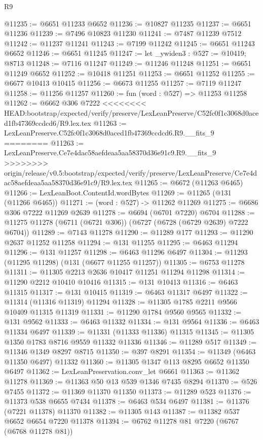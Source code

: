 \begin{lexlean}{R9}
\begin{coremodule}
{{{{{{{{{{{{{{{{{{{{{{{{{{{{{{{{{{{{{{{{{{{{{{{{{{{{{{{{{{{{{{{{{{{{{{{{{{{{{{{{{{{{@11235 := @6651 @11233 @6652
@11236 := @10827 @11235
@11237 := @6651 @11236
@11239 := @7496 @10823 @11230
@11241 := @7487 @11239 @7512
@11242 := @11237 @11241
@11243 := @7199 @11242
@11245 := @6651 @11243 @6652
@11246 := @6651 @11245
@11247 := let _ywiden3 : @527 := @10419; @8713
@11248 := @7116 @11247
@11249 := @11246 @11248
@11251 := @6651 @11249 @6652
@11252 := @10418 @11251
@11253 := @6651 @11252
@11255 := @6677 @10413 @10415
@11256 := @6673 @11255
@11257 := @7119 @11247
@11258 := @11256 @11257
@11260 := fun (word : @527) => @11253 @11258
@11262 := @6662 @306 @7222
<<<<<<<< HEAD:bootstrap/expected/verify/preserve/LexLeanPreserve/C52fc0f1c3068d0aced1fb47369ccdcd6/R9.lex.tex
@11263 := LexLeanPreserve.C52fc0f1c3068d0aced1fb47369ccdcd6.R9.__fits_9
========
@11263 := LexLeanPreserve.Ce7e4dac58aefdeaa5aa58370d36e91c9.R9.__fits_9
>>>>>>>> origin/release/v0.5:bootstrap/expected/verify/preserve/LexLeanPreserve/Ce7e4dac58aefdeaa5aa58370d36e91c9/R9.lex.tex
@11265 := @6672 (@11263 @6465)
@11266 := LexLeanBoot.ContentId.wordBytes
@11269 := @11265 (@131 (@11266 @6465))
@11271 := (word : @527) -> @11262 @11269
@11275 := @6686 @306 @7222 @11269 @2639
@11278 := @6694 (@6701 @7220) @6704
@11288 := @11275 @11278 (@6711 (@6721 @306)) (@6727 (@6728 (@6729 @2639) @7222 @6704))
@11289 := @7143 @11278
@11290 := @11289 @177
@11293 := @11290 @2637 @11252 @11258
@11294 := @131 @11255
@11295 := @6463 @11294
@11296 := @131 @11257
@11298 := @6463 @11296 @6497
@11304 := @11293 (@11295 @11298) (@131 (@6677 @11255 @11257))
@11305 := @6753 @11278
@11311 := @11305 @2213 @2636 @10417 @11251 @11294 @11298
@11314 := @11290 @2212 @10410 @10416
@11315 := @131 @10413
@11316 := @6463 @11315
@11317 := @131 @10415
@11319 := @6463 @11317 @6497
@11322 := @11314 (@11316 @11319) @11294
@11328 := @11305 @1785 @2211 @9566 @10409 @11315 @11319
@11331 := @11290 @1784 @9560 @9565
@11332 := @131 @9562
@11333 := @6463 @11332
@11334 := @131 @9564
@11336 := @6463 @11334 @6497
@11339 := @11331 (@11333 @11336) @11315
@11345 := @11305 @1350 @1783 @8716 @9559 @11332 @11336
@11346 := @11289 @517
@11349 := @11346 @1349 @8297 @8715
@11350 := @397 @8291
@11354 := @11349 (@6463 @11350 @6497) @11332
@11360 := @11305 @1347 @113 @8295 @6652 @11350 @6497
@11362 := LexLeanPreservation.conv_let @6661
@11363 := @11362 @11278
@11369 := @11363 @50 @13 @539 @1346 @7435 @8294
@11370 := @526 @7455
@11372 := @11369 @11370 @11350
@11373 := @11289 @523
@11376 := @11373 @538 @6655 @7434
@11378 := @6463 @534 @6497
@11381 := @11376 (@7221 @11378) @11370
@11382 := @11305 @143
@11387 := @11382 @537 @6652 @6654 @7220 @11378
@11394 := @6762 @11278 @81 @7220 (@6767 (@6768 @11278 @81))
}}}}}}}}}}}}}}}}}}}}}}}}}}}}}}}}}}}}}}}}}}}}}}}}}}}}}}}}}}}}}}}}}}}}}}}}}}}}}}}}}}}}
\end{coremodule}
\end{lexlean}
